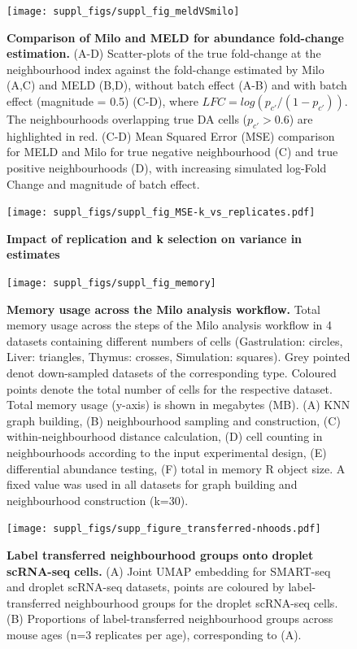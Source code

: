 \documentclass[
]{article}
\begin{document}
\begin{figure}
\texttt{[image: suppl\_figs/suppl\_fig\_meldVSmilo]} \caption{\textbf{Comparison of Milo and MELD for abundance fold-change estimation.} (A-D) Scatter-plots of the true fold-change at the neighbourhood index against the fold-change estimated by Milo (A,C) and MELD (B,D), without batch effect (A-B) and with batch effect (magnitude = 0.5) (C-D), where \(LFC = log(p_{c'}/(1 - p_{c'}))\). The neighbourhoods overlapping true DA cells (\(p_{c'}>0.6\)) are highlighted in red. (C-D) Mean Squared Error (MSE) comparison for MELD and Milo for true negative neighbourhood (C) and true positive neighbourhoods (D), with increasing simulated log-Fold Change and magnitude of batch effect.}\label{fig:sup-fig-bm-meld}
\end{figure}



\begin{figure}
\centering
\texttt{[image: suppl\_figs/suppl\_fig\_MSE-k\_vs\_replicates.pdf]}
\caption{\label{fig:sup-fig-msek}\textbf{Impact of replication and k selection on variance in estimates}}
\end{figure}



\begin{figure}
\texttt{[image: suppl\_figs/suppl\_fig\_memory]} \caption{\textbf{Memory usage across the Milo analysis workflow.}
Total memory usage across the steps of the Milo analysis workflow in 4 datasets containing different numbers of cells (Gastrulation: circles, Liver: triangles, Thymus: crosses, Simulation: squares). Grey pointed denot down-sampled datasets of the corresponding type. Coloured points denote the total number of cells for the respective dataset. Total memory usage (y-axis) is shown in megabytes (MB). (A) KNN graph building, (B) neighbourhood sampling and construction, (C) within-neighbourhood distance calculation, (D) cell counting in neighbourhoods according to the input experimental design, (E) differential abundance testing, (F) total in memory R object size. A fixed value was used in all datasets for graph building and neighbourhood construction (k=30).}\label{fig:sup-fig-scalability}
\end{figure}




\begin{figure}
\centering
\texttt{[image: suppl\_figs/supp\_figure\_transferred-nhoods.pdf]}
\caption{\label{fig:sup-fig-thymus-nhoods}\textbf{Label transferred neighbourhood groups onto droplet scRNA-seq cells.} (A) Joint UMAP embedding for SMART-seq and droplet scRNA-seq datasets, points are coloured by label-transferred neighbourhood groups for the droplet scRNA-seq cells. (B) Proportions of label-transferred neighbourhood groups across mouse ages (n=3 replicates per age), corresponding to (A).}
\end{figure}
\end{document}

